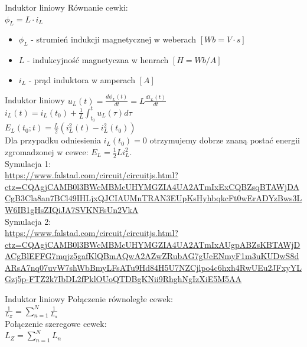 \begin{frame}{Induktor liniowy}
	Równanie cewki:\\
	$\phi_L = L \cdot i_L$ \\
	\begin{itemize}
		\item[\bt] $\phi_L$ - strumień indukcji magnetycznej w weberach $\left[Wb = V \cdot s\right]$
		\item[\bt] $L$ - indukcyjność magnetyczna w henrach $\left[H = Wb/A \right]$
		\item[\bt] $i_L$ - prąd induktora w amperach $\left[A\right]$
	\end{itemize}
\end{frame}

\begin{frame}{Induktor liniowy}
	$u_L(t) = \frac{d \phi_L (t)}{dt} = L \frac{d i_L(t)}{dt}$\\
	$i_L(t) = i_L(t_0) + \frac{1}{L} \int_{t_0}^t u_L(\tau) d \tau$\\
	$E_L(t_0; t) = \frac{L}{2} \left( i^2_L(t) - i^2_L(t_0) \right)$\\
	Dla przypadku odniesienia $i_L(t_0) = 0$ otrzymujemy dobrze znaną postać energii zgromadzonej w cewce: $E_L = \frac{1}{2} L i_L^2$.\\
	Symulacja 1:\\
	\url{https://www.falstad.com/circuit/circuitjs.html?ctz=CQAgjCAMB0l3BWcMBMcUHYMGZIA4UA2ATmIxExCQBZsqBTAWjDACgB3Cla8an7BCl49IHLjxQJCIAUMnTRAN3EUpKsHyhbqkcFt0wErADYzBws3LW6IB1gHsZIQiJA7SVKNFsUn2VkA} \\
	Symulacja 2:\\
	\url{https://www.falstad.com/circuit/circuitjs.html?ctz=CQAgjCAMB0l3BWcMBMcUHYMGZIA4UA2ATmIxAUgpABZsKBTAWjDACgBlEFFG7mqjz5gafKlQBmAQwA2AZwZRubAG7gUeENmyF1m3uKUDwS8dARsA7nq07uvW7shWbBmyLFsATu9Hd84H5U7NZCjlpo4c6hxh4RwUEu2JFxyYLGzj5p-FTZ2k7IbDL2fPklOUoQTDBgKNii9RhghNgIzXiE5M5AA} \\
\end{frame}

\begin{frame}{Induktor liniowy}
	Połączenie równoległe cewek:\\
	$\frac{1}{L_Z} = \sum_{n=1}^N \frac{1}{L_n}$\\
	Połączenie szeregowe cewek:\\
	$L_Z = \sum_{n=1}^N L_n$\\
\end{frame}

